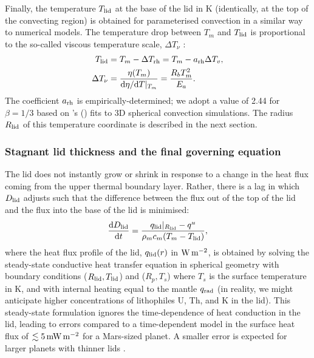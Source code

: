 Finally, the temperature $T_{\rm lid}$ at the base of the lid in K (identically, at the top of the convecting region) is obtained for parameterised convection in a similar way to numerical models. The temperature drop between $T_m$ and $T_{\rm lid}$ is proportional to the so-called viscous temperature scale, $\Delta T_\nu$ \citep{davaille_transient_1993}:
\begin{align}
\label{eq:Tl}
T_{\rm lid} &= T_m - \Delta T_{\rm rh} = T_m - a_{\rm rh} \Delta T_{v},\\
\label{eq:T_rh}
\Delta T_\nu &= \frac{\eta(T_m)}{{\rm d}\eta/{\rm d}T\vert_{T_m}} = \frac{R_b T_m^2}{E_a}.
\end{align}
The coefficient $a_{\rm rh}$ is empirically-determined; we adopt a value of 2.44 for $\beta = 1/3$ based on \citeauthor{thiriet_scaling_2019}'s (\citeyear{thiriet_scaling_2019}) fits to 3D spherical convection simulations. The radius $R_{\rm lid}$ of this temperature coordinate is described in the next section.



\subsubsection{Stagnant lid thickness and the final governing equation}\label{sec:methods-lid1D}

The lid does not instantly grow or shrink in response to a change in the heat flux coming from the upper thermal boundary layer. Rather, there is a lag in which $D_{\rm lid}$ adjusts such that the difference between the flux out of the top of the lid and the flux into the base of the lid is minimised:
\begin{equation}\label{eq:D_l}
\frac{{\rm d} D_{\rm lid}}{{\rm d} t} = \frac{q_{\rm lid}\vert_{R_{\rm lid}} -q^u}{\rho_m c_{m} (T_m - T_{\rm lid})},
\end{equation}
where the heat flux profile of the lid, $q_{\rm lid}(r)$ in ${\rm W\,m^{-2}}$, is obtained by solving the steady-state conductive heat transfer equation in spherical geometry with boundary conditions ($R_{\rm lid}, T_{\rm lid}$) and ($R_p, T_s$) where $T_s$ is the surface temperature in K, and with internal heating equal to the mantle $q_{\rm rad}$ (in reality, we might anticipate higher concentrations of lithophiles U, Th, and K in the lid). This steady-state formulation ignores the time-dependence of heat conduction in the lid, leading to errors compared to a time-dependent model in the surface heat flux of $\lesssim 5\,\rm{mW\,m^{-2}}$ for a Mars-sized planet. A smaller error is expected for larger planets with thinner lids \citep{thiriet_scaling_2019}. 

